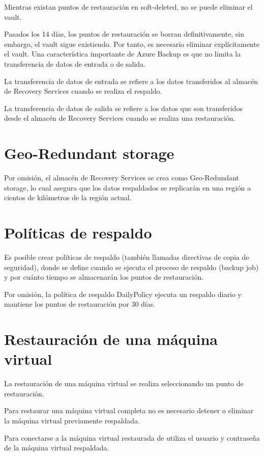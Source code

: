 Mientras existan puntos de restauración en soft-deleted, no se puede eliminar el vault.

Pasados los 14 días, los puntos de restauración se borran definitivamente, sin embargo, el vault sigue existiendo. Por tanto, es necesario eliminar explícitamente el vault. Una característica importante de Azure Backup es que no limita la transferencia de datos de entrada o de salida.

La transferencia de datos de entrada se refiere a los datos transferidos al almacén de Recovery Services cuando se realiza el respaldo.

La transferencia de datos de salida se refiere a los datos que son transferidos desde el almacén de Recovery Services cuando se realiza una restauración.

\section{Geo-Redundant storage}

Por omisión, el almacén de Recovery Services se crea como Geo-Redundant storage, lo cual asegura que los datos respaldados se replicarán en una región a cientos de kilómetros de la región actual.

\section{Políticas de respaldo}

Es posible crear políticas de respaldo (también llamadas directivas de copia de seguridad), donde se define cuando se ejecuta el proceso de respaldo (backup job) y por cuánto tiempo se almacenarán los puntos de restauración.

Por omisión, la política de respaldo DailyPolicy ejecuta un respaldo diario y mantiene los puntos de restauración por 30 días.

\section{Restauración de una máquina virtual}

La restauración de una máquina virtual se realiza seleccionando un punto de restauración.

Para restaurar una máquina virtual completa no es necesario detener o eliminar la máquina virtual previamente respaldada.

Para conectarse a la máquina virtual restaurada de utiliza el usuario y contraseña de la máquina virtual respaldada.

